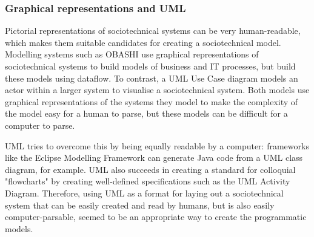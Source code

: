 \documentclass{sig-alternate}
\begin{document}
\subsubsection{Graphical representations and UML}
\label{pictorial}
Pictorial representations of sociotechnical systems can be very human-readable, which makes them suitable candidates for creating a sociotechnical model. Modelling systems such as OBASHI\cite{ObashiMethodology} use graphical representations of sociotechnical systems to build models of business and IT processes, but build these models using dataflow. To contrast, a UML Use Case diagram\cite{omg2010omguml} models an actor within a larger system to visualise a sociotechnical system. Both models use graphical representations of the systems they model to make the complexity of the model easy for a human to parse, but these models can be difficult for a computer to parse. \par
UML tries to overcome this by being equally readable by a computer: frameworks like the Eclipse Modelling Framework can generate Java code from a UML class diagram, for example\cite{EMFManual}. UML also succeeds in creating a standard for colloquial "flowcharts" by creating well-defined specifications such as the UML Activity Diagram. Therefore, using UML as a format for laying out a sociotechnical system that can be easily created and read by humans, but is also easily computer-parsable, seemed to be an appropriate way to create the programmatic models.
\end{document}
